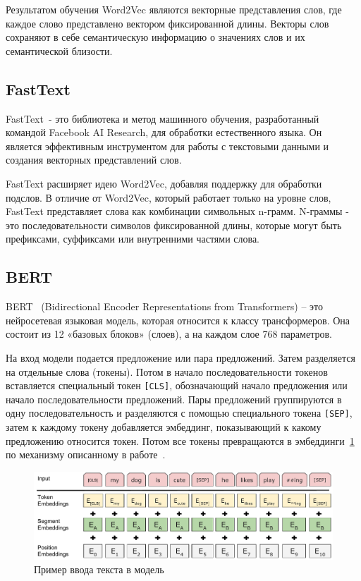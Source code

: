 \documentclass[PI, VKR]{HSEUniversity}
\begin{document}
Результатом обучения Word2Vec являются векторные представления слов, где каждое слово представлено вектором фиксированной длины. Векторы слов сохраняют в себе семантическую информацию о значениях слов и их семантической близости.
\subsection{FastText}
\label{sec:org33e1149}
FastText~\autocite{joulin_bag_2016}- это библиотека и метод машинного обучения, разработанный командой Facebook AI Research, для обработки естественного языка. Он является эффективным инструментом для работы с текстовыми данными и создания векторных представлений слов.

FastText расширяет идею Word2Vec, добавляя поддержку для обработки подслов. В отличие от Word2Vec, который работает только на уровне слов, FastText представляет слова как комбинации символьных n-грамм. N-граммы - это последовательности символов фиксированной длины, которые могут быть префиксами, суффиксами или внутренними частями слова.
\subsection{BERT}
\label{sec:orge0d9d3e}
BERT~\autocite{devlin_bert_2019} (Bidirectional Encoder Representations from Transformers) -- это нейросетевая языковая модель, которая относится к классу трансформеров. Она состоит из 12 «базовых блоков» (слоев), а на каждом слое 768 параметров.

На вход модели подается предложение или пара предложений. Затем разделяется на отдельные слова (токены). Потом в начало последовательности токенов вставляется специальный токен \texttt{[CLS]}, обозначающий начало предложения или начало последовательности предложений. Пары предложений группируются в одну последовательность и разделяются с помощью специального токена \texttt{[SEP]}, затем к каждому токену добавляется эмбеддинг, показывающий к какому предложению относится токен. Потом все токены превращаются в эмбеддинги~\ref{fig:inputemebeddings} по механизму описанному в работе~\autocite{vaswani_attention_2017}.

\begin{figure}[h]
\centering
\includegraphics[width=.9\linewidth]{img/Input_Emebeddings.pdf}
\caption{\label{fig:inputemebeddings}Пример ввода текста в модель}
\end{figure}
\end{document}
